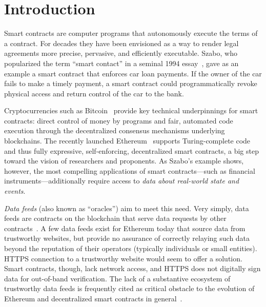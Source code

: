 \section{Introduction}

Smart contracts are computer programs that autonomously execute the terms of a contract.
For decades they have been envisioned as a way to render legal agreements more precise, pervasive, and efficiently executable.
Szabo, who popularized the term ``smart contact'' in a seminal 1994 essay~\cite{szabosmartcontract94}, gave as an example a smart contract that enforces car loan payments. If the owner of the car fails to make a timely payment, a smart contract could programmatically revoke physical access and return control of the car to the bank. %

Cryptocurrencies such as Bitcoin~\cite{bitcoin} provide key technical underpinnings for smart contracts: direct control of money by programs and fair, automated code execution through the decentralized consensus mechanisms underlying  blockchains. 
The recently launched Ethereum~\cite{yellowpaper,whitepaper} supports Turing-complete code and thus fully expressive, self-enforcing, decentralized smart contracts, a big step toward the vision of researchers and proponents.  
As Szabo's example shows, however, the most compelling applications of smart contracts---such as financial instruments---additionally require access to {\em data about real-world state and events}. 

\emph{Data feeds} (also known as ``oracles'') aim to meet this need. Very simply, data feeds are contracts on the blockchain that serve data requests by other contracts~\cite{whitepaper,yellowpaper}. A few data feeds exist for Ethereum today that source data from trustworthy websites, but provide no assurance of correctly relaying such data beyond the reputation of their operators (typically individuals or small entities). HTTPS connection to a trustworthy website would seem to offer a solution. Smart contracts, though, lack network access, and HTTPS does not digitally sign data for out-of-band verification. The lack of a substantive ecosystem of trustworthy data feeds is frequently cited as critical obstacle to the evolution of Ethereum and decentralized smart contracts 
in general~\cite{commblockstream}.

